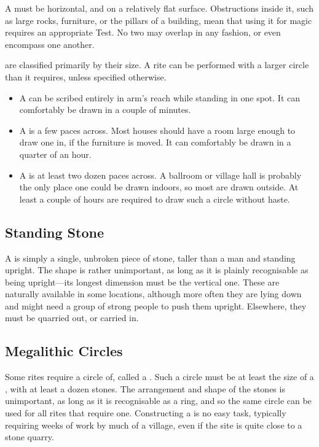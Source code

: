 A  must be horizontal, and on a relatively flat surface.
Obstructions inside it, such as large rocks, furniture, or the pillars of a building, mean that using it for magic requires an appropriate Test.
No two  may overlap in any fashion, or even encompass one another.

 are classified primarily by their size.
A rite can be performed with a larger circle than it requires, unless specified otherwise.
\begin{itemize}
	\item A  can be scribed entirely in arm's reach while standing in one spot.
		It can comfortably be drawn in a couple of minutes.
	\item A  is a few paces across.
		Most houses should have a room large enough to draw one in, if the furniture is moved.
		It can comfortably be drawn in a quarter of an hour.
	\item A  is at least two dozen paces across.
		A ballroom or village hall is probably the only place one could be drawn indoors, so most are drawn outside.
		At least a couple of hours are required to draw such a circle without haste.
\end{itemize}

\subsection{Standing Stone}

A  is simply a single, unbroken piece of stone, taller than a man and standing upright.
The shape is rather unimportant, as long as it is plainly recognisable as being upright---its longest dimension must be the vertical one.
These are naturally available in some locations, although more often they are lying down and might need a group of strong people to push them upright.
Elsewhere, they must be quarried out, or carried in.

\subsection{Megalithic Circles}

Some rites require a circle of, called a .
Such a circle must be at least the size of a , with at least a dozen stones.
The arrangement and shape of the stones is unimportant, as long as it is recognisable as a ring, and so the same circle can be used for all rites that require one.
Constructing a  is no easy task, typically requiring weeks of work by much of a village, even if the site is quite close to a stone quarry.

